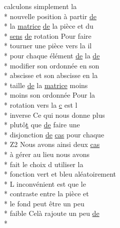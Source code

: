 \begin{DoxyCompactItemize}
calculons simplement la \\*
nouvelle position à partir \hyperlink{mainpage_8dox_ab37fa35e77d95c6d0d0ab620c97c3db8}{de} \\*
la \hyperlink{mainpage_8dox_af2e36bcdda8980a3e5c1f4013331ee45}{matrice} \hyperlink{mainpage_8dox_ab37fa35e77d95c6d0d0ab620c97c3db8}{de} la pièce et du \\*
\hyperlink{mainpage_8dox_aa08a2c237abaf70493855740d9c5d0c8}{sens} \hyperlink{mainpage_8dox_ab37fa35e77d95c6d0d0ab620c97c3db8}{de} rotation Pour faire \\*
tourner une pièce vers la il \\*
pour chaque élément \hyperlink{mainpage_8dox_ab37fa35e77d95c6d0d0ab620c97c3db8}{de} la \hyperlink{mainpage_8dox_ab37fa35e77d95c6d0d0ab620c97c3db8}{de} \\*
modifier son ordonnée en son \\*
abscisse et son abscisse en la \\*
taille \hyperlink{mainpage_8dox_ab37fa35e77d95c6d0d0ab620c97c3db8}{de} la \hyperlink{mainpage_8dox_af2e36bcdda8980a3e5c1f4013331ee45}{matrice} moins \\*
moins son ordonnée Pour la \\*
rotation vers la \hyperlink{glext_8h_a1f2d7f8147412c43ba2303a56f97ee73}{c} est l \\*
inverse Ce qui nous donne plus \\*
plutô\hyperlink{gl_8h_a00140d6f5c548b26daf170bf16e86a6d}{t} que \hyperlink{mainpage_8dox_ab37fa35e77d95c6d0d0ab620c97c3db8}{de} faire une \\*
disjonction \hyperlink{mainpage_8dox_ab37fa35e77d95c6d0d0ab620c97c3db8}{de} \hyperlink{mainpage_8dox_a28d908e91a20ecb016d27b941f85907c}{cas} pour chaque \\*
Z2 Nous avons ainsi deux \hyperlink{mainpage_8dox_a28d908e91a20ecb016d27b941f85907c}{cas} \\*
à \hyperlink{glext_8h_a9cd653b1648845554169fbc3a3f6d37a}{g}érer au lieu nous avons \\*
fait le choix d utiliser la \\*
fonction vert et bleu aléatoirement \\*
L inconvénient est que le \\*
contraste entre la pièce et \\*
le fond peut être un peu \\*
faible Celà rajoute un peu \hyperlink{mainpage_8dox_ab37fa35e77d95c6d0d0ab620c97c3db8}{de} \\*

\end{DoxyCompactItemize}
